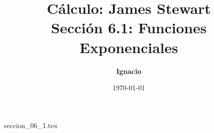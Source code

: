 \documentclass[11pt,spanish,oneside]{report}
\title{\textbf{Cálculo: James Stewart} \\ \Large Sección 6.1: Funciones Exponenciales}
\author{\textbf{Ignacio}}
\date{\today}
\begin{document}
\maketitle

{seccion_06_1.tex}
\end{document}
